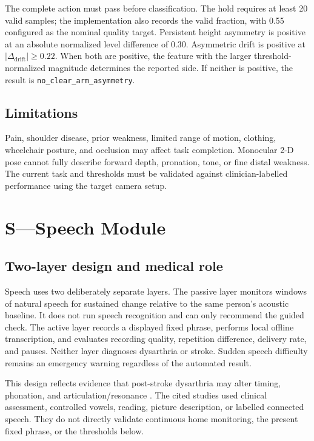 \documentclass[11pt,a4paper]{article}
\begin{document}
The complete action must pass before classification. The hold requires at least 20 valid samples; the implementation also records the valid fraction, with 0.55 configured as the nominal quality target. Persistent height asymmetry is positive at an absolute normalized level difference of 0.30. Asymmetric drift is positive at $|\Delta_{\mathrm{drift}}|\geq0.22$. When both are positive, the feature with the larger threshold-normalized magnitude determines the reported side. If neither is positive, the result is \texttt{no\_clear\_arm\_asymmetry}.

\subsection{Limitations}

Pain, shoulder disease, prior weakness, limited range of motion, clothing, wheelchair posture, and occlusion may affect task completion. Monocular 2-D pose cannot fully describe forward depth, pronation, tone, or fine distal weakness. The current task and thresholds must be validated against clinician-labelled performance using the target camera setup.

\section{S---Speech Module}

\subsection{Two-layer design and medical role}

Speech uses two deliberately separate layers. The passive layer monitors windows of natural speech for sustained change relative to the same person's acoustic baseline. It does not run speech recognition and can only recommend the guided check. The active layer records a displayed fixed phrase, performs local offline transcription, and evaluates recording quality, repetition difference, delivery rate, and pauses. Neither layer diagnoses dysarthria or stroke. Sudden speech difficulty remains an emergency warning regardless of the automated result.

This design reflects evidence that post-stroke dysarthria may alter timing, phonation, and articulation/resonance \cite{decock2021acute,kim2011acoustic,mou2018mandarin,ge2021vowels,wong2022tdcs,sanguedolce2025stroke,jyothi2026stroke}. The cited studies used clinical assessment, controlled vowels, reading, picture description, or labelled connected speech. They do not directly validate continuous home monitoring, the present fixed phrase, or the thresholds below.
\end{document}
